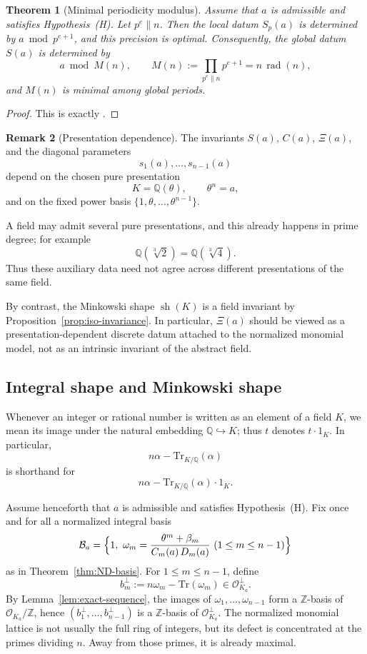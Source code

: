 \documentclass[11pt,letterpaper]{amsart}
\newcommand{\Q}{\mathbb{Q}}
\newcommand{\Z}{\mathbb{Z}}
\newcommand{\cO}{\mathcal{O}}
\newcommand{\Tr}{\mathrm{Tr}}
\theoremstyle{plain}
\newtheorem{theorem}{Theorem}[section]
\theoremstyle{definition}
\newtheorem{remark}[theorem]{Remark}
\begin{document}
\begin{theorem}[Minimal periodicity modulus]\label{thm:min-periodicity}
Assume that $a$ is admissible and satisfies Hypothesis~\textup{(H)}.
Let $p^e\parallel n$.
Then the local datum $S_p(a)$ is determined by $a\bmod p^{e+1}$, and this precision is optimal.
Consequently, the global datum $S(a)$ is determined by
\[
a\bmod M(n),
\qquad
M(n):=\prod_{p^e\parallel n}p^{e+1}=n\,\operatorname{rad}(n),
\]
and $M(n)$ is minimal among global periods.
\end{theorem}

\begin{proof}
This is exactly \cite[Theorem~3.1]{NguyenDang2025MinPeriod}.
\end{proof}

\begin{remark}[Presentation dependence]
\label{rem:presentation}
The invariants \(S(a)\), \(C(a)\), \(\Xi(a)\), and the diagonal parameters
\[
s_1(a),\dots,s_{n-1}(a)
\]
depend on the chosen pure presentation
\[
K=\Q(\theta),\qquad \theta^n=a,
\]
and on the fixed power basis \(\{1,\theta,\dots,\theta^{n-1}\}\).

A field may admit several pure presentations, and this already happens in
prime degree; for example
\[
\Q(\sqrt[3]{2})=\Q(\sqrt[3]{4}).
\]
Thus these auxiliary data need not agree across different presentations of
the same field.

By contrast, the Minkowski shape \(\operatorname{sh}(K)\) is a field
invariant by Proposition~\ref{prop:iso-invariance}.
In particular, \(\Xi(a)\) should be viewed as a presentation-dependent
discrete datum attached to the normalized monomial model, not as an intrinsic
invariant of the abstract field.
\end{remark}

\subsection{Integral shape and Minkowski shape}

Whenever an integer or rational number is written as an element of a field \(K\), we
mean its image under the natural embedding \(\Q\hookrightarrow K\); thus \(t\) denotes
\(t\cdot 1_K\). In particular,
\[
n\alpha-\Tr_{K/\Q}(\alpha)
\]
is shorthand for
\[
n\alpha-\Tr_{K/\Q}(\alpha)\cdot 1_K.
\]

Assume henceforth that \(a\) is admissible and satisfies Hypothesis~\textup{(H)}.
Fix once and for all a normalized integral basis
\[
\mathcal B_a=
\Bigl\{1,\ \omega_m=\frac{\theta^m+\beta_m}{C_m(a)\,D_m(a)}\ (1\le m\le n-1)\Bigr\}
\]
as in Theorem~\ref{thm:ND-basis}. For \(1\le m\le n-1\), define
\[
b_m^\perp:=n\omega_m-\Tr(\omega_m)\in \cO_{K_a}^\perp.
\]
By Lemma~\ref{lem:exact-sequence}, the images of \(\omega_1,\dots,\omega_{n-1}\) form a
\(\Z\)-basis of \(\cO_{K_a}/\Z\), hence \((b_1^\perp,\dots,b_{n-1}^\perp)\) is a \(\Z\)-basis
of \(\cO_{K_a}^\perp\). The normalized monomial lattice is not usually the full ring of integers, but its defect is concentrated at the primes dividing \(n\). Away from those primes, it is already maximal.
\end{document}
